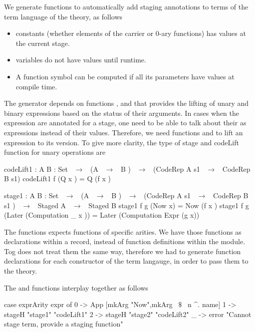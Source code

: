 We generate functions to automatically add staging annotations to terms of the term language of the theory, as follows
\begin{itemize}
\item constants (whether elements of the carrier or $0$-ary functions) has values at the current stage. 
\item variables do not have values until runtime. 
\item A function symbol can be computed if all its parameters have values at compile time. 
\end{itemize}
The generator depends on functions , and  that provides the lifting of unary and binary expressions based on the status of their arguments. In cases when the expression are annotated for a  stage, one need to be able to talk about their  as expressions instead of their values. Therefore, we need functions  and  to lift an expression to its  version. To give more clarity, the type of stage and codeLift function for unary operations are 
\begin{togcode} 
codeLift1 : {A B  : Set }  ~$\to$~ (A  ~$\to$~ B )  ~$\to$~ 
                       (CodeRep A s1 ~$\to$~ CodeRep B s1)
codeLift1 f (Q x )  = Q (f x )

stage1 : {A B  : Set } ~$\to$~ (A ~$\to$~ B ) ~$\to$~ 
                       (CodeRep A s1 ~$\to$~ CodeRep B s1 ) ~$\to$~ 
                       Staged A ~$\to$~ Staged B
stage1 f g (Now x)  = Now (f x )
stage1 f g (Later (Computation _ x ))  =  Later (Computation Expr (g x))
\end{togcode} 

The  functions expects functions of specific arities. We have those functions as declarations within a record, instead of function definitions within the module. Tog does not treat them the same way, therefore we had to generate function declarations for each constructor of the term langauge, in order to pass them to the theory. 

The  and  functions interplay together as follows 
\begin{hscode} 
case exprArity expr of
  0 -> App [mkArg "Now",mkArg ~$\$$~ n ^. name]
  1 -> stageH "stage1" "codeLift1"
  2 -> stageH "stage2" "codeLift2"
  _ -> error "Cannot stage term, provide a staging function" 
\end{hscode} 

